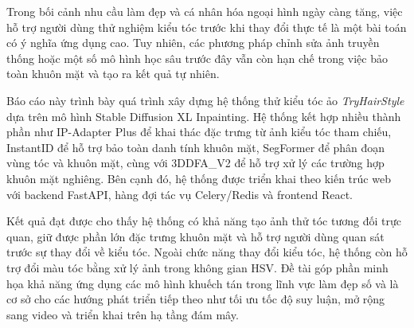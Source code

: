 \documentclass[../main.tex]{subfiles}
\begin{document}
Trong bối cảnh nhu cầu làm đẹp và cá nhân hóa ngoại hình ngày càng tăng, việc hỗ trợ người dùng thử nghiệm kiểu tóc trước khi thay đổi thực tế là một bài toán có ý nghĩa ứng dụng cao. Tuy nhiên, các phương pháp chỉnh sửa ảnh truyền thống hoặc một số mô hình học sâu trước đây vẫn còn hạn chế trong việc bảo toàn khuôn mặt và tạo ra kết quả tự nhiên.

Báo cáo này trình bày quá trình xây dựng hệ thống thử kiểu tóc ảo \textit{TryHairStyle} dựa trên mô hình Stable Diffusion XL Inpainting. Hệ thống kết hợp nhiều thành phần như IP-Adapter Plus để khai thác đặc trưng từ ảnh kiểu tóc tham chiếu, InstantID để hỗ trợ bảo toàn danh tính khuôn mặt, SegFormer để phân đoạn vùng tóc và khuôn mặt, cùng với 3DDFA\_V2 để hỗ trợ xử lý các trường hợp khuôn mặt nghiêng. Bên cạnh đó, hệ thống được triển khai theo kiến trúc web với backend FastAPI, hàng đợi tác vụ Celery/Redis và frontend React.

Kết quả đạt được cho thấy hệ thống có khả năng tạo ảnh thử tóc tương đối trực quan, giữ được phần lớn đặc trưng khuôn mặt và hỗ trợ người dùng quan sát trước sự thay đổi về kiểu tóc. Ngoài chức năng thay đổi kiểu tóc, hệ thống còn hỗ trợ đổi màu tóc bằng xử lý ảnh trong không gian HSV. Đề tài góp phần minh họa khả năng ứng dụng các mô hình khuếch tán trong lĩnh vực làm đẹp số và là cơ sở cho các hướng phát triển tiếp theo như tối ưu tốc độ suy luận, mở rộng sang video và triển khai trên hạ tầng đám mây.
\end{document}
